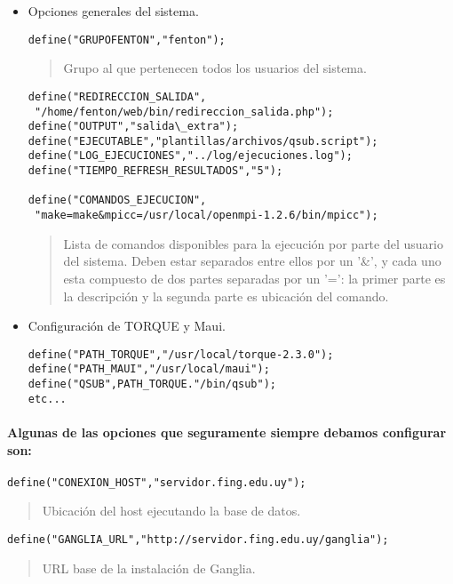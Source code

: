 \documentclass[a4paper,10pt,spanish]{article}
\begin{document}
\begin{itemize}
\item Opciones generales del sistema.
\begin{verbatim}
define("GRUPOFENTON","fenton");
\end{verbatim} 
\begin{quote}
Grupo al que pertenecen todos los usuarios del sistema.
\end{quote}
\begin{verbatim}
define("REDIRECCION_SALIDA",
 "/home/fenton/web/bin/redireccion_salida.php");
define("OUTPUT","salida\_extra");
define("EJECUTABLE","plantillas/archivos/qsub.script");
define("LOG_EJECUCIONES","../log/ejecuciones.log");
define("TIEMPO_REFRESH_RESULTADOS","5");

define("COMANDOS_EJECUCION",
 "make=make&mpicc=/usr/local/openmpi-1.2.6/bin/mpicc");
\end{verbatim}
\begin{quote}
Lista de comandos disponibles para la ejecuci\'{o}n por parte del usuario del sistema. Deben estar separados entre ellos por un '\&', y cada uno esta compuesto de dos partes separadas por un '=': la primer parte es la descripci\'{o}n y la segunda parte es ubicaci\'{o}n del comando.
\end{quote}

\item Configuraci\'{o}n de TORQUE y Maui.
\begin{verbatim}
define("PATH_TORQUE","/usr/local/torque-2.3.0");
define("PATH_MAUI","/usr/local/maui");
define("QSUB",PATH_TORQUE."/bin/qsub");
etc...
\end{verbatim}

\end{itemize}

\paragraph{Algunas de las opciones que seguramente siempre debamos configurar son:}
\begin{verbatim}
define("CONEXION_HOST","servidor.fing.edu.uy");
\end{verbatim}
\begin{quote}
Ubicaci\'{o}n del host ejecutando la base de datos.
\end{quote}
\begin{verbatim}
define("GANGLIA_URL","http://servidor.fing.edu.uy/ganglia");
\end{verbatim}
\begin{quote}
URL base de la instalaci\'{o}n de Ganglia.
\end{quote}
\end{document}
